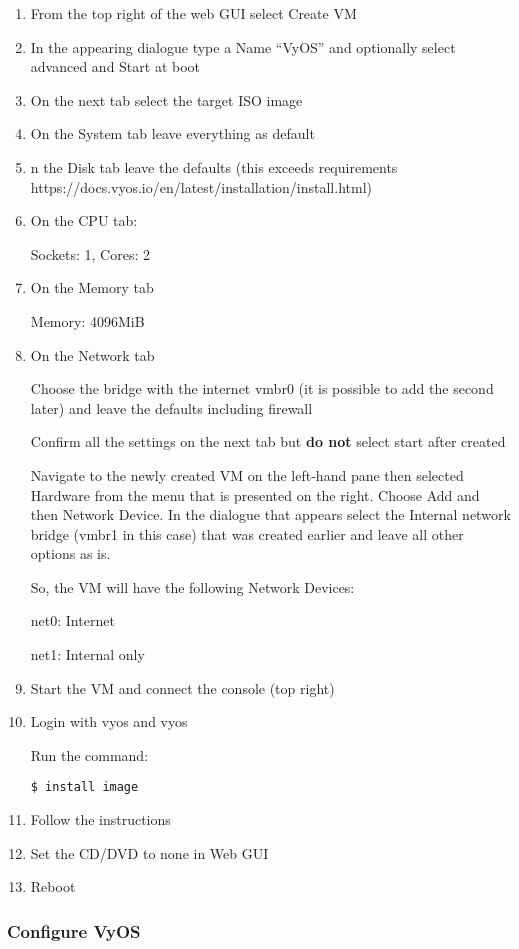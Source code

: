 \documentclass[
	11pt, %
	fleqn, %
	a4paper, %
]{LegrandOrangeBook}
\begin{document}
\begin{enumerate}
\def\labelenumi{\arabic{enumi}.}
\item
  From the top right of the web GUI select Create VM
\item
  In the appearing dialogue type a Name ``VyOS'' and optionally select
  advanced and Start at boot
\item
  On the next tab select the target ISO image
\item
  On the System tab leave everything as default
\item
  n the Disk tab leave the defaults (this exceeds requirements
  https://docs.vyos.io/en/latest/installation/install.html)
\item
  On the CPU tab:

  Sockets: 1, Cores: 2
\item
  On the Memory tab

  Memory: 4096MiB
\item
  On the Network tab

  Choose the bridge with the internet vmbr0 (it is possible to add the
  second later) and leave the defaults including firewall

  Confirm all the settings on the next tab but \textbf{do not} select
  start after created

  Navigate to the newly created VM on the left-hand pane then selected
  Hardware from the menu that is presented on the right. Choose Add and
  then Network Device. In the dialogue that appears select the Internal
  network bridge (vmbr1 in this case) that was created earlier and leave
  all other options as is.

  So, the VM will have the following Network Devices:

  net0: Internet

  net1: Internal only
\item
  Start the VM and connect the console (top right)
\item
  Login with vyos and vyos

  Run the command:

\begin{verbatim}
$ install image
\end{verbatim}
\item
  Follow the instructions
\item
  Set the CD/DVD to none in Web GUI
\item
  Reboot
\end{enumerate}

\hypertarget{configure-vyos}{%
\subsubsection{Configure VyOS}\label{configure-vyos}}
\end{document}
